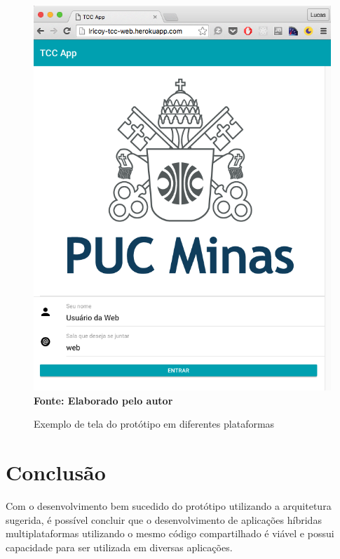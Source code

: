 \begin{figure}[ht]
	\centering	
	\caption[\hspace{0.1cm}Exemplo de tela do protótipo em diferentes plataformas.]{Exemplo de tela do protótipo em diferentes plataformas}
	\vspace{-0.4cm}
	\includegraphics[width=1\textwidth]{figuras/ExemploTela.png}
	\vspace{-0.2cm}
	\\\textbf{\footnotesize Fonte: Elaborado pelo autor }
	\label{fig:figura5}
\end{figure}
\vspace{-0.5cm}


\section{\esp Conclusão}

Com o desenvolvimento bem sucedido do protótipo utilizando a arquitetura sugerida, é possível concluir que o desenvolvimento de aplicações híbridas multiplataformas utilizando o mesmo código compartilhado é viável e possui capacidade para ser utilizada em diversas aplicações.

